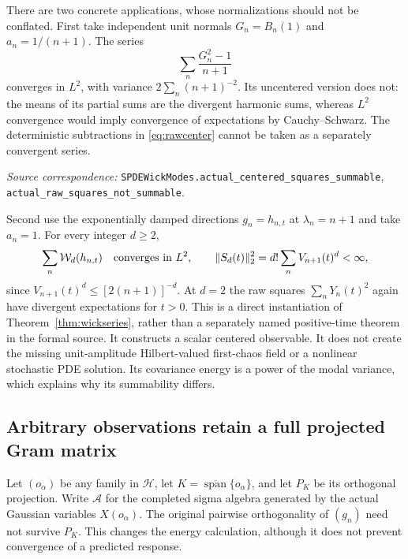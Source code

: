 \documentclass[11pt]{article}
\newcommand{\Hh}{\mathcal H}\newcommand{\tr}{\operatorname{tr}}
\newcommand{\code}[1]{{\small\nolinkurl{#1}}}
\begin{document}
There are two concrete applications, whose normalizations should not
be conflated. First take independent unit normals $G_n=B_n(1)$ and
$a_n=1/(n+1)$. The series
\begin{equation}\label{eq:rawcenter}
 \sum_n\frac{G_n^2-1}{n+1}
\end{equation}
converges in $L^2$, with variance $2\sum_n(n+1)^{-2}$. Its uncentered
version does not: the means of its partial sums are the divergent
harmonic sums, whereas $L^2$ convergence would imply convergence of
expectations by Cauchy--Schwarz. The deterministic subtractions in
\eqref{eq:rawcenter} cannot be taken as a separately convergent series.
\par\smallskip\begingroup\small\raggedright
\noindent\textit{Source correspondence:}
\code{SPDEWickModes.actual_centered_squares_summable},
\code{actual_raw_squares_not_summable}.\par\endgroup

Second use the exponentially damped directions $g_n=h_{n,t}$ at
$\lambda_n=n+1$ and take $a_n=1$. For every integer $d\geq2$,
\[
 \sum_n\mathcal W_d(h_{n,t})\quad\hbox{converges in }L^2,
 \qquad \|S_d(t)\|_2^2=d!\sum_nV_{n+1}(t)^d<\infty,
\]
since $V_{n+1}(t)^d\leq[2(n+1)]^{-d}$. At $d=2$ the raw squares
$\sum_nY_n(t)^2$ again have divergent expectations for $t>0$.
This is a direct instantiation of Theorem~\ref{thm:wickseries}, rather
than a separately named positive-time theorem in the formal source.
It constructs a scalar centered observable. It does not create the
missing unit-amplitude Hilbert-valued first-chaos field or a nonlinear
stochastic PDE solution. Its covariance energy is a power of the
modal variance, which explains why its summability differs.

\subsection{Arbitrary observations retain a full projected Gram matrix}
Let $(o_\alpha)$ be any family in $\Hh$, let
$K=\overline{\operatorname{span}}\{o_\alpha\}$, and let $P_K$ be its
orthogonal projection. Write $\mathcal A$ for the completed sigma
algebra generated by the actual Gaussian variables $X(o_\alpha)$.
The original pairwise orthogonality of $(g_n)$ need not survive
$P_K$. This changes the energy calculation, although it does not
prevent convergence of a predicted response.
\end{document}
